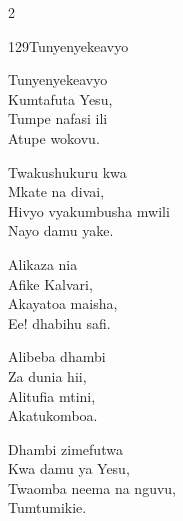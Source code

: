 \begin{multicols}{2}
\begin{hymn}{129}{Tunyenyekeavyo}{}
\begin{stanza}
Tunyenyekeavyo\\
Kumtafuta Yesu,\\
Tumpe nafasi ili\\
Atupe wokovu.
\end{stanza}
\begin{chorus}
Twakushukuru kwa\\
Mkate na divai,\\
Hivyo vyakumbusha mwili\\
Nayo damu yake.
\end{chorus}
\begin{stanza}
Alikaza nia\\
Afike Kalvari,\\
Akayatoa maisha,\\
Ee! dhabihu safi.
\end{stanza}
\begin{stanza}
Alibeba dhambi\\
Za dunia hii,\\
Alitufia mtini,\\
Akatukomboa.
\end{stanza}
\begin{stanza}
Dhambi zimefutwa\\
Kwa damu ya Yesu,\\
Twaomba neema na nguvu,\\
Tumtumikie.
\end{stanza}
\end{hymn}


\end{multicols}
